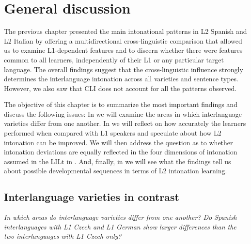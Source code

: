 \chapter{General discussion}\label{ch:5}

The previous chapter presented the main intonational patterns in L2 Spanish and L2 Italian by offering a multidirectional cross-linguistic comparison that allowed us to examine L1-dependent features and to discern whether there were features common to all learners, independently of their L1 or any particular target language. The overall findings suggest that the cross-linguistic influence strongly determines the interlanguage intonation across all varieties and sentence types. However, we also saw that CLI does not account for all the patterns observed.


The objective of this chapter is to summarize the most important findings and discuss the following issues: In  we will examine the areas in which interlanguage varieties differ from one another. In  we will reflect on how accurately the learners performed when compared with L1 speakers and speculate about how L2 intonation can be improved. We will then address the question as to whether intonation deviations are equally reflected in the four dimensions of intonation assumed in the LILt in . And, finally, in  we will see what the findings tell us about possible developmental sequences in terms of L2 intonation learning.


\section{Interlanguage varieties in contrast}\label{sec:5.1}  %

\textit{In which areas do interlanguage varieties differ from one another? Do Spanish interlanguages with L1 Czech and L1 German show larger differences than the two interlanguages with L1 Czech only?}


